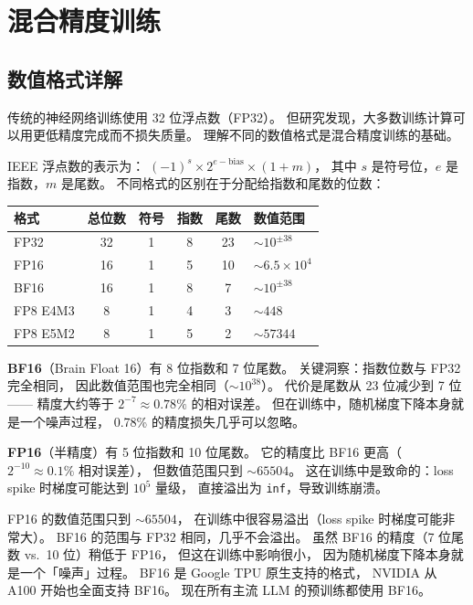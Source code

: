 \section{混合精度训练}

\subsection{数值格式详解}

传统的神经网络训练使用 32 位浮点数（FP32）。
但研究发现，大多数训练计算可以用更低精度完成而不损失质量。
理解不同的数值格式是混合精度训练的基础。

IEEE 浮点数的表示为：
$(-1)^s \times 2^{e - \mathrm{bias}} \times (1 + m)$，
其中 $s$ 是符号位，$e$ 是指数，$m$ 是尾数。
不同格式的区别在于分配给指数和尾数的位数：

\begin{center}
\begin{tabular}{lccccl}
  \hline
  \textbf{格式} & \textbf{总位数} & \textbf{符号} & \textbf{指数} & \textbf{尾数}
  & \textbf{数值范围} \\
  \hline
  FP32 & 32 & 1 & 8 & 23 & $\sim 10^{\pm 38}$ \\
  FP16 & 16 & 1 & 5 & 10 & $\sim 6.5 \times 10^4$ \\
  BF16 & 16 & 1 & 8 & 7 & $\sim 10^{\pm 38}$ \\
  FP8 E4M3 & 8 & 1 & 4 & 3 & $\sim 448$ \\
  FP8 E5M2 & 8 & 1 & 5 & 2 & $\sim 57344$ \\
  \hline
\end{tabular}
\end{center}

\textbf{BF16}（Brain Float 16）有 8 位指数和 7 位尾数。
关键洞察：指数位数与 FP32 完全相同，
因此数值范围也完全相同（$\sim 10^{38}$）。
代价是尾数从 23 位减少到 7 位——
精度大约等于 $2^{-7} \approx 0.78\%$ 的相对误差。
但在训练中，随机梯度下降本身就是一个噪声过程，
0.78\% 的精度损失几乎可以忽略。

\textbf{FP16}（半精度）有 5 位指数和 10 位尾数。
它的精度比 BF16 更高（$2^{-10} \approx 0.1\%$ 相对误差），
但数值范围只到 $\sim 65504$。
这在训练中是致命的：loss spike 时梯度可能达到 $10^5$ 量级，
直接溢出为 \texttt{inf}，导致训练崩溃。

\begin{whybox}[为什么 BF16 优于 FP16？]
FP16 的数值范围只到 $\sim 65504$，
在训练中很容易溢出（loss spike 时梯度可能非常大）。
BF16 的范围与 FP32 相同，几乎不会溢出。
虽然 BF16 的精度（7 位尾数 vs.\ 10 位）稍低于 FP16，
但这在训练中影响很小，
因为随机梯度下降本身就是一个「噪声」过程。
BF16 是 Google TPU 原生支持的格式，
NVIDIA 从 A100 开始也全面支持 BF16。
现在所有主流 LLM 的预训练都使用 BF16。
\end{whybox}

